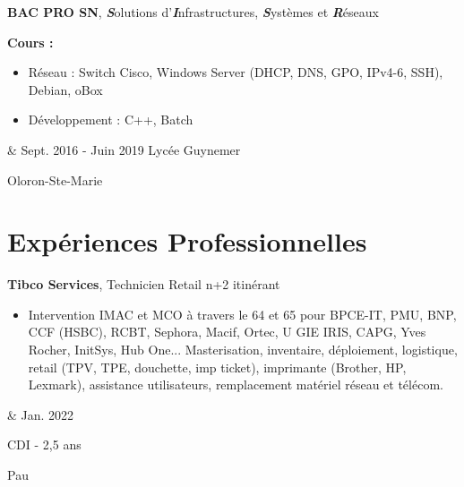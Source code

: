 \documentclass[10pt, fr-FR]{article}
\newenvironment{highlights}{\begin{itemize}[topsep=0pt,parsep=0.10 cm,partopsep=0pt,itemsep=0pt,after=\vspace{-1\baselineskip},leftmargin=0.4 cm + 3pt]}{\end{itemize}}
\let\originalTabularx\tabularx
\let\originalEndTabularx\endtabularx
\renewenvironment{tabularx}{\bgroup\centering\originalTabularx}{\originalEndTabularx\par\egroup}
\begin{document}
\begin{tabularx}{
	\textwidth-0.4 cm-0.13cm
	}{
	K{0.2 cm}
	R{4.1 cm}
	}
	\textbf{BAC PRO SN}, \textbf{\textit{S}}olutions d'\textbf{\textit{I}}nfrastructures, \textbf{\textit{S}}ystèmes et \textbf{\textit{R}}éseaux
	
	\hspace{0 cm} 
	\textbf{Cours :}
	\vspace{0.10 cm}
	
	\begin{highlights}
	\item Réseau : Switch Cisco, Windows Server (DHCP, DNS, GPO, IPv4-6, SSH), Debian, oBox
	\item Développement : C++, Batch
	\end{highlights}
	  &   
	Sept. 2016 - Juin 2019
	Lycée Guynemer
	            
	Oloron-Ste-Marie
\end{tabularx}

\section{Expériences Professionnelles}

\begin{tabularx}{
	\textwidth-0.4 cm-0.13cm
	}{
	K{0.2 cm}
	R{4.1 cm}
	}
	\textbf{Tibco Services}, Technicien Retail n+2 itinérant
	
	\vspace{0.10 cm}
	
	\begin{highlights}
	\item Intervention IMAC et MCO à travers le 64 et 65 pour BPCE-IT, PMU, BNP, CCF (HSBC), RCBT, Sephora, Macif, Ortec, U GIE IRIS, CAPG, Yves Rocher, InitSys, Hub One... Masterisation, inventaire, déploiement, logistique, retail (TPV, TPE, douchette, imp ticket), imprimante (Brother, HP, Lexmark), assistance utilisateurs, remplacement matériel réseau et télécom. 
	\end{highlights}
	  &   
	Jan. 2022
	            
	CDI - 2,5 ans
	            
	Pau
\end{tabularx}
\end{document}
